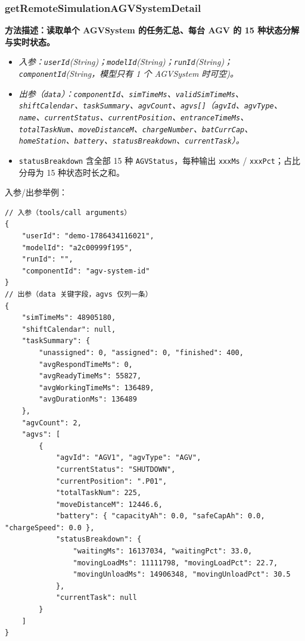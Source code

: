 \subsubsection{getRemoteSimulationAGVSystemDetail}
\bf{方法描述}：读取单个 AGVSystem 的任务汇总、每台 AGV 的 15 种状态分解与实时状态。
\begin{itemize}
	\item \it{入参}：\texttt{userId}(String)；\texttt{modelId}(String)；\texttt{runId}(String)；\texttt{componentId}(String，模型只有 1 个 AGVSystem 时可空)。
	\item \it{出参}（\texttt{data}）：\texttt{componentId}、\texttt{simTimeMs}、\texttt{validSimTimeMs}、\texttt{shiftCalendar}、\texttt{taskSummary}、\texttt{agvCount}、\texttt{agvs[]}（\texttt{agvId}、\texttt{agvType}、\texttt{name}、\texttt{currentStatus}、\texttt{currentPosition}、\texttt{entranceTimeMs}、\texttt{totalTaskNum}、\texttt{moveDistanceM}、\texttt{chargeNumber}、\texttt{batCurrCap}、\texttt{homeStation}、\texttt{battery}、\texttt{statusBreakdown}、\texttt{currentTask}）。
	\item \texttt{statusBreakdown} 含全部 15 种 \texttt{AGVStatus}，每种输出 \texttt{xxxMs} / \texttt{xxxPct}；占比分母为 15 种状态时长之和。
\end{itemize}
入参/出参举例：
\begin{lstlisting}
// 入参（tools/call arguments）
{
    "userId": "demo-1786434116021",
    "modelId": "a2c00999f195",
    "runId": "",
    "componentId": "agv-system-id"
}
// 出参（data 关键字段，agvs 仅列一条）
{
    "simTimeMs": 48905180,
    "shiftCalendar": null,
    "taskSummary": {
        "unassigned": 0, "assigned": 0, "finished": 400,
        "avgRespondTimeMs": 0,
        "avgReadyTimeMs": 55827,
        "avgWorkingTimeMs": 136489,
        "avgDurationMs": 136489
    },
    "agvCount": 2,
    "agvs": [
        {
            "agvId": "AGV1", "agvType": "AGV",
            "currentStatus": "SHUTDOWN",
            "currentPosition": ".P01",
            "totalTaskNum": 225,
            "moveDistanceM": 12446.6,
            "battery": { "capacityAh": 0.0, "safeCapAh": 0.0, "chargeSpeed": 0.0 },
            "statusBreakdown": {
                "waitingMs": 16137034, "waitingPct": 33.0,
                "movingLoadMs": 11111798, "movingLoadPct": 22.7,
                "movingUnloadMs": 14906348, "movingUnloadPct": 30.5
            },
            "currentTask": null
        }
    ]
}
\end{lstlisting}\vspace{-30pt}

